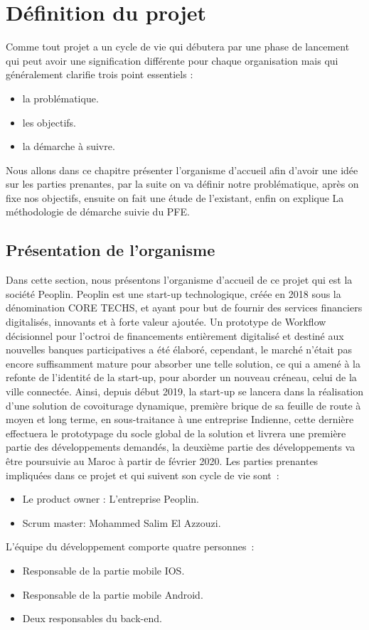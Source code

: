 \chapter{Définition du projet}

Comme tout projet a un cycle de vie qui débutera par une phase de lancement qui peut avoir une signification différente pour chaque organisation mais qui généralement clarifie trois point essentiels :
\begin{itemize}
	\item la problématique.
	\item les objectifs.
	\item la démarche à suivre.
\end{itemize}
Nous allons dans ce chapitre présenter l'organisme d’accueil afin d'avoir une idée sur les parties prenantes, par la suite on va définir notre problématique, après on fixe nos objectifs, ensuite on fait une étude de l'existant, enfin on explique La méthodologie de démarche suivie du PFE.


\section{Présentation de l’organisme}

Dans cette section, nous présentons l’organisme d’accueil de ce projet qui est la société Peoplin.\newline
Peoplin est une start-up technologique, créée en 2018 sous la dénomination CORE TECHS, et ayant pour but de fournir des services financiers digitalisés, innovants et à forte valeur ajoutée. Un prototype de Workflow décisionnel pour l’octroi de financements entièrement digitalisé et destiné aux nouvelles banques participatives a été élaboré, cependant, le marché n’était pas encore suffisamment mature pour absorber une telle solution, ce qui a amené à la refonte de l’identité de la start-up, pour aborder un nouveau créneau, celui de la ville connectée.\newline 
Ainsi, depuis début 2019, la start-up se lancera dans la réalisation d’une solution de covoiturage dynamique, première brique de sa feuille de route à moyen et long terme, en sous-traitance à une entreprise Indienne, cette dernière effectuera le prototypage du socle global de la solution et livrera une première partie des développements demandés, la deuxième partie des développements va être poursuivie au Maroc à partir de février 2020.\newline
Les parties prenantes impliquées dans ce projet et qui suivent son cycle de vie sont : 
\begin{itemize}
	\item Le product owner : L’entreprise Peoplin.
	\item Scrum master: Mohammed Salim El Azzouzi.
\end{itemize}
L’équipe du développement comporte quatre personnes :
\begin{itemize}
	\item Responsable de la partie mobile IOS.
	\item Responsable de la partie mobile Android.
	\item Deux responsables du back-end.
\end{itemize}

